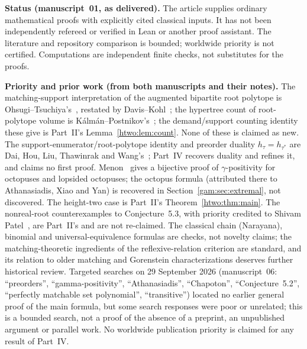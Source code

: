 \documentclass[11pt]{article}
\numberwithin{equation}{section}
\theoremstyle{definition}
\begin{document}
\begin{statusbox}
\small\textbf{Status (manuscript~01, as delivered).} The article supplies
ordinary mathematical proofs with explicitly cited classical inputs. It has
not been independently refereed or verified in Lean or another proof
assistant. The literature and repository comparison is bounded; worldwide
priority is not certified. Computations are independent finite checks, not
substitutes for the proofs.
\end{statusbox}

\begin{statusbox}
\small\textbf{Priority and prior work (from both manuscripts and their
notes).} The matching-support interpretation of the augmented bipartite root
polytope is Ohsugi--Tsuchiya's~\cite[Propositions~3.3--3.4]{OT20}, restated
by Davis--Kohl~\cite[Theorem~3.10]{DK}; the hypertree count of root-polytope
volume is K\'alm\'an--Postnikov's~\cite{KP}; the demand/support counting
identity these give is Part~II's Lemma~\ref{htwo:lem:count}. None of these
is claimed as new. The support-enumerator/root-polytope identity and
preorder duality $h_\tau=h_{\tau^*}$ are Dai, Hou, Liu, Thawinrak and
Wang's~\cite[Theorems~1.2--1.3]{DHLTW}; Part~IV recovers duality and refines
it, and claims no first proof. Menon~\cite{Menon} gives a bijective proof of
$\gamma$-positivity for octopuses and lopsided octopuses; the octopus formula
(attributed there to Athanasiadis, Xiao and Yan) is recovered in
Section~\ref{gam:sec:extremal}, not discovered. The height-two case is
Part~II's Theorem~\ref{htwo:thm:main}. The nonreal-root counterexamples to
Conjecture~5.3, with priority credited to Shivam Patel~\cite{Patel}, are
Part~II's and are not re-claimed. The classical chain (Narayana), binomial
and universal-equivalence formulas are checks, not novelty claims; the
matching-theoretic ingredients of the reflexive-relation criterion are
standard, and its relation to older matching and Gorenstein
characterizations deserves further historical review. Targeted searches on
29 September 2026 (manuscript~06: ``preorders'', ``gamma-positivity'',
``Athanasiadis'', ``Chapoton'', ``Conjecture~5.2'', ``perfectly matchable
set polynomial'', ``transitive'') located no earlier general proof of the
main formula, but some search responses were poor or unrelated; this is a
bounded search, not a proof of the absence of a preprint, an unpublished
argument or parallel work. No worldwide publication priority is claimed for
any result of Part~IV.
\end{statusbox}
\end{document}
